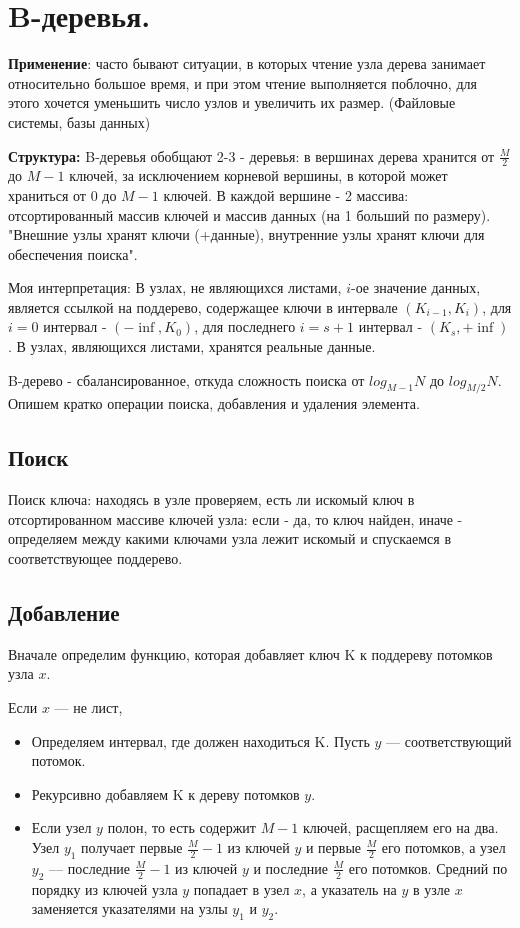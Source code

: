 \section{B-деревья.}

{\bf Применение}: часто бывают ситуации, в которых чтение узла дерева занимает относительно большое время, и при этом чтение выполняется поблочно, для этого хочется уменьшить число узлов и увеличить их размер.
(Файловые системы, базы данных)

{\bf Структура:} B-деревья обобщают 2-3 - деревья: в вершинах дерева хранится от $\frac{M}{2}$ до $M-1$ ключей, за исключением корневой вершины, в которой может храниться от $0$ до $M-1$ ключей. 
В каждой вершине - 2 массива: отсортированный массив ключей и массив данных (на 1 больший по размеру). "Внешние узлы хранят ключи (+данные), внутренние узлы хранят ключи для обеспечения поиска". 

Моя интерпретация:
В узлах, не являющихся листами, $i$-ое значение данных, является ссылкой на поддерево, содержащее ключи в интервале $(K_{i-1}, K_i)$, для $i = 0$ интервал - $(-\inf, K_0)$, для последнего $i = s+1$ интервал - $(K_s, +\inf)$. В узлах, являющихся листами, хранятся реальные данные. 

B-дерево - сбалансированное, откуда сложность поиска от $log_{M-1}{N}$ до $log_{M/2}{N}$. Опишем кратко операции поиска, добавления и удаления элемента.

\subsection*{Поиск}
Поиск ключа: находясь в узле проверяем, есть ли искомый ключ в отсортированном массиве ключей узла: если - да, то ключ найден, иначе  - определяем между какими ключами узла лежит искомый и спускаемся в соответствующее поддерево.

\subsection*{Добавление}
Вначале определим функцию, которая добавляет ключ K к поддереву потомков узла $x$.

Если $x$ — не лист,
	\begin{itemize}
        \item Определяем интервал, где должен находиться K. Пусть $y$ — соответствующий потомок.
        \item Рекурсивно добавляем K к дереву потомков $y$.
        \item Если узел $y$ полон, то есть содержит $M-1$ ключей, расщепляем его на два. Узел $y_1$ получает первые $\frac{M}{2}-1$ из ключей $y$ и первые $\frac{M}{2}$ его потомков, а узел $y_2$ — последние $\frac{M}{2}-1$ из ключей $y$ и последние $\frac{M}{2}$ его потомков. Средний по порядку из ключей узла $y$ попадает в узел $x$, а указатель на $y$ в узле $x$ заменяется указателями на узлы $y_1$ и $y_2$.
	\end{itemize}    	
	
